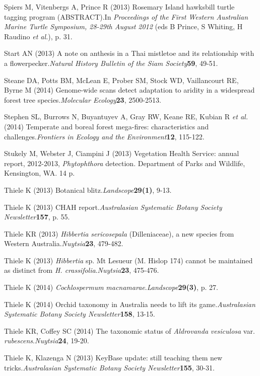 \documentclass[version=last, paper=a4, DIV=18, usenames, dvipsnames]{scrartcl}
\begin{document}
Spiers M, Vitenbergs A, Prince R (2013) Rosemary Island hawksbill turtle tagging program (ABSTRACT).In \emph{Proceedings of the First Western Australian Marine Turtle Symposium, 28-29th August 2012} (eds B Prince, S Whiting, H Raudino \emph{et al.}), p. 31.


Start AN (2013) A note on anthesis in a Thai mistletoe and its relationship with a flowerpecker.\emph{Natural History Bulletin of the Siam Society}\textbf{59}, 49-51.


Steane DA, Potts BM, McLean E, Prober SM, Stock WD, Vaillancourt RE, Byrne M (2014) Genome-wide scans detect adaptation to aridity in a widespread forest tree species.\emph{Molecular Ecology}\textbf{23}, 2500-2513.


Stephen SL, Burrows N, Buyantuyev A, Gray RW, Keane RE, Kubian R \emph{et al.} (2014) Temperate and boreal forest mega-fires: characteristics and challenges.\emph{Frontiers in Ecology and the Environment}\textbf{12}, 115-122.


Stukely M, Webster J, Ciampini J (2013) Vegetation Health Service: annual report, 2012-2013, \emph{Phytophthora} detection. Department of Parks and Wildlife, Kensington, WA. 14 p.


Thiele K (2013) Botanical blitz.\emph{Landscope}\textbf{29(1)}, 9-13.


Thiele K (2013) CHAH report.\emph{Australasian Systematic Botany Society Newsletter}\textbf{157}, p. 55.


Thiele KR (2013) \emph{Hibbertia} \emph{sericosepala} (Dilleniaceae), a new species from Western Australia.\emph{Nuytsia}\textbf{23}, 479-482.


Thiele K (2013) \emph{Hibbertia} sp. Mt Lesueur (M. Hislop 174) cannot be maintained as distinct from \emph{H. crassifolia}.\emph{Nuytsia}\textbf{23}, 475-476.


Thiele K (2014) \emph{Cochlospermum} \emph{macnamarae}.\emph{Landscope}\textbf{29(3)}, p. 27.


Thiele K (2014) Orchid taxonomy in Australia needs to lift its game.\emph{Australasian Systematic Botany Society Newsletter}\textbf{158}, 13-15.


Thiele KR, Coffey SC (2014) The taxonomic status of \emph{Aldrovanda} \emph{vesiculosa} var. \emph{rubescens}.\emph{Nuytsia}\textbf{24}, 19-20.


Thiele K, Klazenga N (2013) KeyBase update: still teaching them new tricks.\emph{Australasian Systematic Botany Society Newsletter}\textbf{155}, 30-31.
\end{document}
